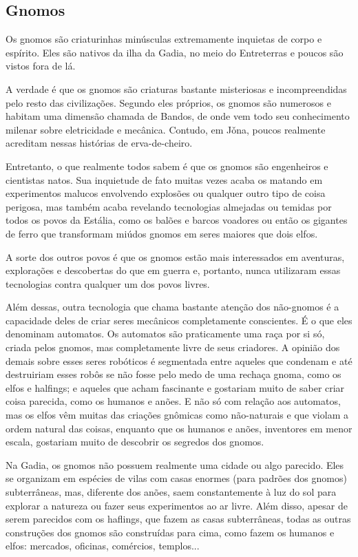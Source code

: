 \documentclass{RPG_Adventure}[2021/10/20]
\begin{document}
\begin{multicols}{2}
\section{Gnomos}%

Os gnomos são criaturinhas minúsculas extremamente inquietas de corpo e
espírito. Eles são nativos da ilha da Gadia, no meio do Entreterras e poucos são
vistos fora de lá.

A verdade é que os gnomos são criaturas bastante misteriosas e incompreendidas
pelo resto das civilizações. Segundo eles próprios, os gnomos são numerosos e
habitam uma dimensão chamada de Bandos, de onde vem todo seu conhecimento
milenar sobre eletricidade e mecânica. Contudo, em Jǒna, poucos realmente
acreditam nessas histórias de erva-de-cheiro.

Entretanto, o que realmente todos sabem é que os gnomos são engenheiros e
cientistas natos. Sua inquietude de fato muitas vezes acaba os matando em
experimentos malucos envolvendo explosões ou qualquer outro tipo de coisa
perigosa, mas também acaba revelando tecnologias almejadas ou temidas por todos
os povos da Estália, como os balões e barcos voadores ou então os gigantes de
ferro que transformam miúdos gnomos em seres maiores que dois elfos.

A sorte dos outros povos é que os gnomos estão mais interessados em aventuras,
explorações e descobertas do que em guerra e, portanto, nunca utilizaram essas
tecnologias contra qualquer um dos povos livres.

Além dessas, outra tecnologia que chama bastante atenção dos não-gnomos é a
capacidade deles de criar seres mecânicos completamente conscientes. É o que
eles denominam automatos. Os automatos são praticamente uma raça por si só,
criada pelos gnomos, mas completamente livre de seus criadores. A opinião dos
demais sobre esses seres robóticos é segmentada entre aqueles que condenam e até
destruiriam esses robôs se não fosse pelo medo de uma rechaça gnoma, como os
elfos e halfings; e aqueles que acham fascinante e gostariam muito de saber
criar coisa parecida, como os humanos e anões. E não só com relação aos
automatos, mas os elfos vêm muitas das criações gnômicas como não-naturais e que
violam a ordem natural das coisas, enquanto que os humanos e anões, inventores
em menor escala, gostariam muito de descobrir os segredos dos gnomos.

Na Gadia, os gnomos não possuem realmente uma cidade ou algo parecido. Eles se
organizam em espécies de vilas com casas enormes (para padrões dos gnomos)
subterrâneas, mas, diferente dos anões, saem constantemente à luz do sol para
explorar a natureza ou fazer seus experimentos ao ar livre. Além disso, apesar
de serem parecidos com os haflings, que fazem as casas subterrâneas, todas as
outras construções dos gnomos são construídas para cima, como fazem os humanos e
elfos: mercados, oficinas, comércios, templos...


\end{multicols}
\end{document}
